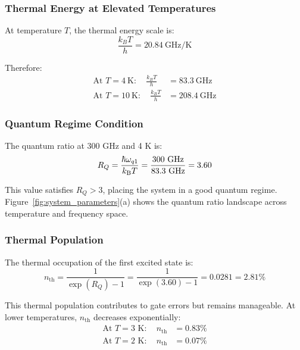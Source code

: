 \subsubsection*{Thermal Energy at Elevated Temperatures}

At temperature $T$, the thermal energy scale is:
\begin{equation}
\frac{k_B T}{h} = 20.84~\text{GHz/K}
\end{equation}

Therefore:
\begin{align}
\text{At } T = 4~\text{K}: \quad \frac{k_B T}{h} &= 83.3~\text{GHz} \\
\text{At } T = 10~\text{K}: \quad \frac{k_B T}{h} &= 208.4~\text{GHz}
\end{align}

\subsubsection*{Quantum Regime Condition}

The quantum ratio at 300 GHz and 4 K is:
\begin{equation}
R_Q = \frac{\hbar\omega_{q1}}{k_{\mathrm{B}} T} = \frac{300 \text{ GHz}}{83.3 \text{ GHz}} = 3.60
\label{eq:quantum_ratio}
\end{equation}
    
This value satisfies $R_Q > 3$, placing the system in a good quantum regime. Figure~\ref{fig:system_parameters}(a) shows the quantum ratio landscape across temperature and frequency space.

\subsubsection{Thermal Population}

The thermal occupation of the first excited state is:
\begin{equation}
n_{\text{th}} = \frac{1}{\exp(R_Q) - 1} = \frac{1}{\exp(3.60) - 1} = 0.0281 = 2.81\%
\label{eq:thermal_pop_300ghz}
\end{equation}

This thermal population contributes to gate errors but remains manageable. At lower temperatures, $n_{\text{th}}$ decreases exponentially:
\begin{align}
\text{At } T = 3 \text{ K}: \quad n_{\text{th}} &= 0.83\% \\
\text{At } T = 2 \text{ K}: \quad n_{\text{th}} &= 0.07\%
\end{align}

